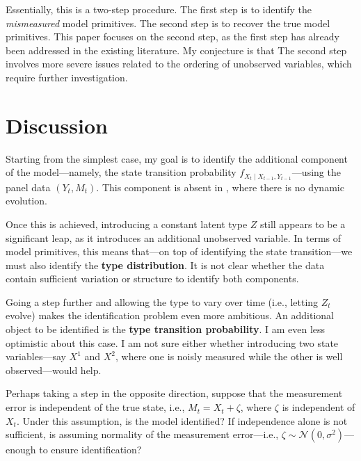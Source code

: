 \documentclass[12pt]{article}
\begin{document}
Essentially, this is a two-step procedure. The first step is to identify the \textit{mismeasured} model primitives. The second step is to recover the true model primitives. This paper focuses on the second step, as the first step has already been addressed in the existing literature. My conjecture is that The second step involves more severe issues related to the ordering of unobserved variables, which require further investigation.


\section{Discussion}

Starting from the simplest case, my goal is to identify the additional component of the model—namely, the state transition probability $f_{X_t \mid X_{t-1}, Y_{t-1}}$—using the panel data $(Y_t, M_t)$. This component is absent in \citet{hu2008identification}, where there is no dynamic evolution.

Once this is achieved, introducing a constant latent type $Z$ still appears to be a significant leap, as it introduces an additional unobserved variable. In terms of model primitives, this means that—on top of identifying the state transition—we must also identify the \textbf{type distribution}. It is not clear whether the data contain sufficient variation or structure to identify both components.

Going a step further and allowing the type to vary over time (i.e., letting $Z_t$ evolve) makes the identification problem even more ambitious. An additional object to be identified is the \textbf{type transition probability}. I am even less optimistic about this case. I am not sure either whether introducing two state variables—say $X^1$ and $X^2$, where one is noisly measured while the other is well observed—would help.

Perhaps taking a step in the opposite direction, suppose that the measurement error is independent of the true state, i.e., \( M_t = X_t + \zeta \), where \( \zeta \) is independent of \( X_t \). Under this assumption, is the model identified? If independence alone is not sufficient, is assuming normality of the measurement error—i.e., \( \zeta \sim \mathcal{N}(0, \sigma^2) \)—enough to ensure identification?

\pagebreak \newpage 
\end{document}
